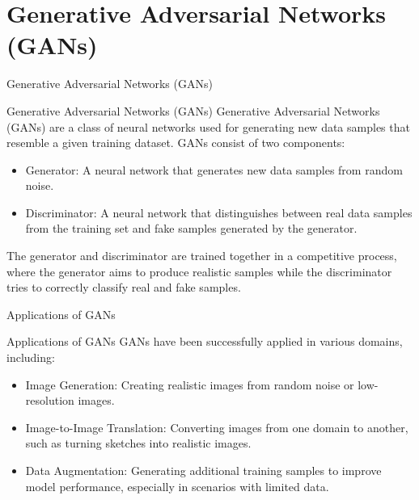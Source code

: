\documentclass[hyperref={pdfpagelabels=false},aspectratio=169]{beamer}
\begin{document}
\section[GANs]{Generative Adversarial Networks (GANs)}
\label{sec:orge57429e}
\begin{frame}[label={sec:org38473db}]{Generative Adversarial Networks (GANs)}
\begin{block}{Generative Adversarial Networks (GANs)}
Generative Adversarial Networks (GANs) are a class of neural networks used for generating new data samples that resemble a given training dataset. GANs consist of two components:
\begin{itemize}
\item \alert{Generator}: A neural network that generates new data samples from random noise.
\item \alert{Discriminator}: A neural network that distinguishes between real data samples from the training set and fake samples generated by the generator.
\end{itemize}
The generator and discriminator are trained together in a competitive process, where the generator aims to produce realistic samples while the discriminator tries to correctly classify real and fake samples.
\end{block}
\end{frame}
\begin{frame}[label={sec:org76a19f7}]{Applications of GANs}
\begin{block}{Applications of GANs}
GANs have been successfully applied in various domains, including:
\begin{itemize}
\item \alert{Image Generation}: Creating realistic images from random noise or low-resolution images.
\item \alert{Image-to-Image Translation}: Converting images from one domain to another, such as turning sketches into realistic images.
\item \alert{Data Augmentation}: Generating additional training samples to improve model performance, especially in scenarios with limited data.
\end{itemize}
\end{block}
\end{frame}
\end{document}
